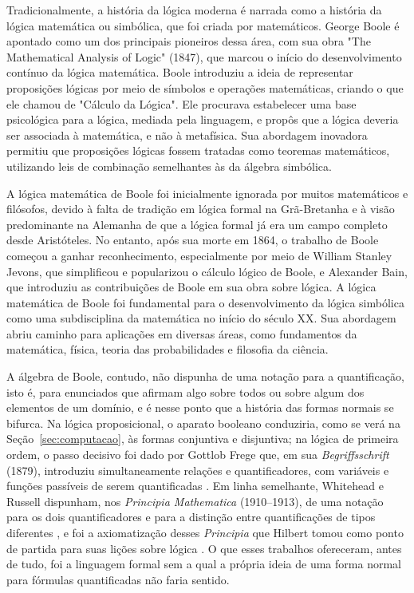 \documentclass[12pt,a4paper,oneside]{report}
\theoremstyle{tituloplain}
\theoremstyle{titulodef}
\begin{document}
Tradicionalmente, a história da lógica moderna é narrada como a história da lógica matemática ou simbólica, que foi criada por matemáticos. George Boole é apontado como um dos principais pioneiros dessa área, com sua obra "The Mathematical Analysis of Logic" (1847), que marcou o início do desenvolvimento contínuo da lógica matemática. Boole introduziu a ideia de representar proposições lógicas por meio de símbolos e operações matemáticas, criando o que ele chamou de "Cálculo da Lógica". Ele procurava estabelecer uma base psicológica para a lógica, mediada pela linguagem, e propôs que a lógica deveria ser associada à matemática, e não à metafísica. Sua abordagem inovadora permitiu que proposições lógicas fossem tratadas como teoremas matemáticos, utilizando leis de combinação semelhantes às da álgebra simbólica.

A lógica matemática de Boole foi inicialmente ignorada por muitos matemáticos e filósofos, devido à falta de tradição em lógica formal na Grã-Bretanha e à visão predominante na Alemanha de que a lógica formal já era um campo completo desde Aristóteles. No entanto, após sua morte em 1864, o trabalho de Boole começou a ganhar reconhecimento, especialmente por meio de William Stanley Jevons, que simplificou e popularizou o cálculo lógico de Boole, e Alexander Bain, que introduziu as contribuições de Boole em sua obra sobre lógica. A lógica matemática de Boole foi fundamental para o desenvolvimento da lógica simbólica como uma subdisciplina da matemática no início do século XX. Sua abordagem abriu caminho para aplicações em diversas áreas, como fundamentos da matemática, física, teoria das probabilidades e filosofia da ciência. \cite{Peckhaus_1999}

A álgebra de Boole, contudo, não dispunha de uma notação para a quantificação, isto é, para enunciados que afirmam algo sobre todos ou sobre algum dos elementos de um domínio, e é nesse ponto que a história das formas normais se bifurca. Na lógica proposicional, o aparato booleano conduziria, como se verá na Seção~\ref{sec:computacao}, às formas conjuntiva e disjuntiva; na lógica de primeira ordem, o passo decisivo foi dado por Gottlob Frege que, em sua \textit{Begriffsschrift} (1879), introduziu simultaneamente relações e quantificadores, com variáveis e funções passíveis de serem quantificadas \cite{frege1879,ewald2018}. Em linha semelhante, Whitehead e Russell dispunham, nos \textit{Principia Mathematica} (1910--1913), de uma notação para os dois quantificadores e para a distinção entre quantificações de tipos diferentes \cite{whiteheadrussell1910,ewald2018}, e foi a axiomatização desses \textit{Principia} que Hilbert tomou como ponto de partida para suas lições sobre lógica \cite{ewald2018}. O que esses trabalhos ofereceram, antes de tudo, foi a linguagem formal sem a qual a própria ideia de uma forma normal para fórmulas quantificadas não faria sentido.
\end{document}

